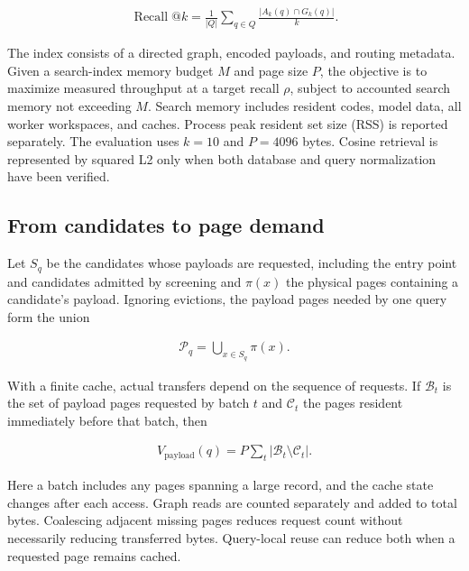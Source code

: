\begin{equation}
\begin{gathered}
\operatorname{Recall}@k=\frac{1}{|Q|}\sum_{q\in Q}\frac{|A_k(q)\cap G_k(q)|}{k}.
\end{gathered}
\end{equation}

The index consists of a directed graph, encoded payloads, and routing metadata. Given a search-index memory budget $M$ and page size $P$, the objective is to maximize measured throughput at a target recall $\rho$, subject to accounted search memory not exceeding $M$. Search memory includes resident codes, model data, all worker workspaces, and caches. Process peak resident set size (RSS) is reported separately. The evaluation uses $k=10$ and $P=4096$ bytes. Cosine retrieval is represented by squared L2 only when both database and query normalization have been verified.

\subsection{From candidates to page demand}

Let $S_q$ be the candidates whose payloads are requested, including the entry point and candidates admitted by screening and $\pi(x)$ the physical pages containing a candidate's payload. Ignoring evictions, the payload pages needed by one query form the union

\begin{equation}
\begin{gathered}
\mathcal{P}_q=\bigcup_{x\in S_q}\pi(x).
\end{gathered}
\end{equation}

With a finite cache, actual transfers depend on the sequence of requests. If $\mathcal{B}_t$ is the set of payload pages requested by batch $t$ and $\mathcal{C}_t$ the pages resident immediately before that batch, then

\begin{equation}
\begin{gathered}
V_{\mathrm{payload}}(q)=P\sum_t|\mathcal{B}_t\setminus\mathcal{C}_t|.
\end{gathered}
\end{equation}

Here a batch includes any pages spanning a large record, and the cache state changes after each access. Graph reads are counted separately and added to total bytes. Coalescing adjacent missing pages reduces request count without necessarily reducing transferred bytes. Query-local reuse can reduce both when a requested page remains cached.

